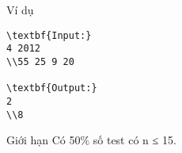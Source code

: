 Ví dụ  
\begin{verbatim}
\textbf{Input:}
4 2012
\\55 25 9 20

\textbf{Output:}
2
\\8\end{verbatim}
   Giới hạn  
Có 50\% số test có n ≤ 15.